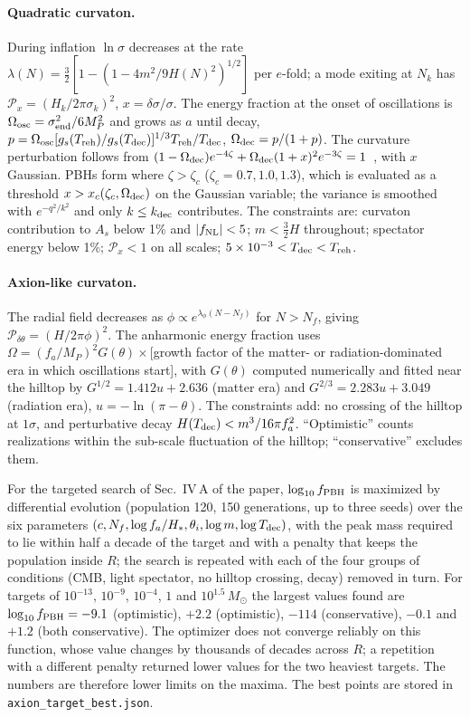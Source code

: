 \documentclass[aps,prd,onecolumn,superscriptaddress,nofootinbib,floatfix]{revtex4-2}
\newcommand{\fpbh}{f_{\rm PBH}}
\newcommand{\Msun}{M_\odot}
\newcommand{\Treh}{T_{\rm reh}}
\newcommand{\code}[1]{\texttt{#1}}
\begin{document}
\paragraph*{Quadratic curvaton.}
During inflation $\ln\sigma$ decreases at the rate $\lambda(N)=\frac32[1-(1-4m^2/9H(N)^2)^{1/2}]$ per $e$-fold; a mode exiting at $N_k$ has $\mathcal{P}_x=(H_k/2\pi\sigma_k)^2$, $x=\delta\sigma/\sigma$. The energy fraction at the onset of oscillations is $\Omega_{\rm osc}=\sigma_{\rm end}^2/6M_P^2$ and grows as $a$ until decay, $p=\Omega_{\rm osc}[g_s(\Treh)/g_s(T_{\rm dec})]^{1/3}\Treh/T_{\rm dec}$, $\Omega_{\rm dec}=p/(1+p)$. The curvature perturbation follows from $(1-\Omega_{\rm dec})e^{-4\zeta}+\Omega_{\rm dec}(1+x)^2e^{-3\zeta}=1$~\cite{Sasaki:2006kq}, with $x$ Gaussian. PBHs form where $\zeta>\zeta_c$ ($\zeta_c=0.7,1.0,1.3$), which is evaluated as a threshold $x>x_c(\zeta_c,\Omega_{\rm dec})$ on the Gaussian variable; the variance is smoothed with $e^{-q^2/k^2}$ and only $k\le k_{\rm dec}$ contributes. The constraints are: curvaton contribution to $A_s$ below 1\% and $|f_{\rm NL}|<5$; $m<\frac32H$ throughout; spectator energy below 1\%; $\mathcal{P}_x<1$ on all scales; $5\times10^{-3}<T_{\rm dec}<\Treh$.

\paragraph*{Axion-like curvaton.}
The radial field decreases as $\phi\propto e^{\lambda_\phi(N-N_f)}$ for $N>N_f$, giving $\mathcal{P}_{\delta\theta}=(H/2\pi\phi)^2$. The anharmonic energy fraction uses $\Omega=(f_a/M_P)^2G(\theta)\times$[growth factor of the matter- or radiation-dominated era in which oscillations start], with $G(\theta)$ computed numerically and fitted near the hilltop by $G^{1/2}=1.412u+2.636$ (matter era) and $G^{2/3}=2.283u+3.049$ (radiation era), $u=-\ln(\pi-\theta)$. The constraints add: no crossing of the hilltop at $1\sigma$, and perturbative decay $H(T_{\rm dec})<m^3/16\pi f_a^2$. ``Optimistic'' counts realizations within the sub-scale fluctuation of the hilltop; ``conservative'' excludes them.

For the targeted search of Sec.~IV\,A of the paper, $\log_{10}\fpbh$ is maximized by differential evolution (population 120, 150 generations, up to three seeds) over the six parameters $(c,N_f,\log f_a/H_\ast,\theta_i,\log m,\log T_{\rm dec})$, with the peak mass required to lie within half a decade of the target and with a penalty that keeps the population inside $R$; the search is repeated with each of the four groups of conditions (CMB, light spectator, no hilltop crossing, decay) removed in turn. For targets of $10^{-13}$, $10^{-9}$, $10^{-4}$, $1$ and $10^{1.5}\,\Msun$ the largest values found are $\log_{10}\fpbh=-9.1$ (optimistic), $+2.2$ (optimistic), $-114$ (conservative), $-0.1$ and $+1.2$ (both conservative). The optimizer does not converge reliably on this function, whose value changes by thousands of decades across $R$; a repetition with a different penalty returned lower values for the two heaviest targets. The numbers are therefore lower limits on the maxima. The best points are stored in \code{axion\_target\_best.json}.
\end{document}
